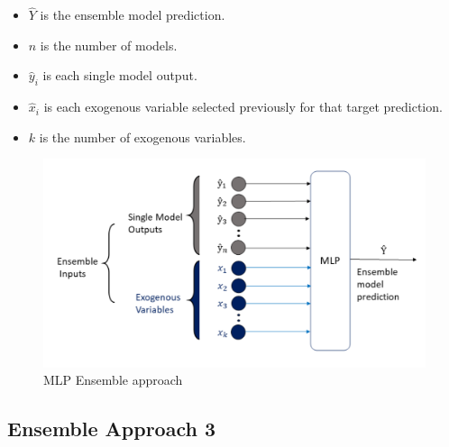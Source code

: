 \begin{itemize}
    \item \begin{math}\hat{Y}\end{math} is the ensemble model prediction.
    \item \begin{math}n\end{math} is the number of models.
    \item \begin{math}\hat{y}_i\end{math} is each single model output.
    \item \begin{math}\hat{x}_i\end{math} is each exogenous variable selected previously for that target prediction.
    \item \begin{math}k\end{math} is the number of exogenous variables.
\end{itemize}

\begin{figure}[h]
\centering
\includegraphics[width=\linewidth]{figures/Ch4/Ensemble_Approach2.pdf}
\caption{MLP Ensemble approach}
\label{f:Ensemble-approach2}
\end{figure}

\subsection{Ensemble Approach 3}
\label{s:Ensemble-Approach3}

